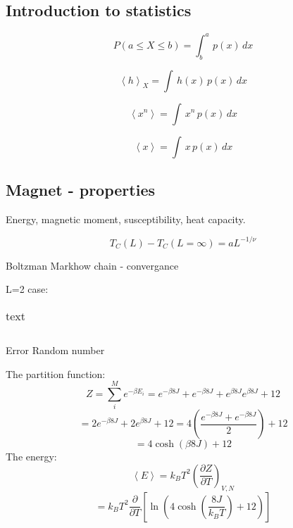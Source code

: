 \subsection{Introduction to statistics}

\begin{equation}\label{eq:probability_density}
P(a\leq X \leq b) = \int_b^a\, p(x)\, dx
\end{equation}

\begin{equation}\label{eq:expectation_value}
\left< h \right>_X = \int \,h(x) \,p(x)\,dx
\end{equation}

\begin{equation}\label{eq:moment}
\left< x^n \right> = \int \,x^n \,p(x)\,dx
\end{equation}

\begin{equation}\label{eq:mean_value}
\left< x \right> = \int \,x \,p(x)\,dx
\end{equation}

\subsection{Magnet - properties}

Energy, magnetic moment, susceptibility, heat capacity.

\begin{equation}\label{eq:critical_T}
T_C(L) - T_C(L=\infty) = a L^{-1/\nu}
\end{equation}

Boltzman
Markhow chain - convergance

L=2 case:
\begin{table}[H]
	\caption{text}
	\label{tab: makro}
\begin{tabular}{cccccc}
	
\end{tabular}
\end{table}

Error
Random number

The partition function:
\[
Z = \sum_i^M e^{-\beta E_i} = e^{-\beta 8 J} + e^{-\beta 8 J} + e^{\beta 8 J}e^{\beta 8 J} + 12
\]
\[
= 2e^{-\beta 8 J}+ 2e^{\beta 8 J} + 12 = 4\left(\frac{e^{-\beta 8 J}+ e^{-\beta 8 J}}{2}\right)+12
\]
\[
= 4 \cosh\left( \beta 8 J \right) + 12
\]
 The energy:
\[
\left< E \right> = k_B T^2 \left(\frac{\partial Z}{\partial T}
\right)_{V,N}
\]
\[
= k_B T^2 \frac{\partial}{\partial T} \left[\ln \left(4\cosh \left(\frac{8J}{k_BT}\right) +12\right) \right]\]

